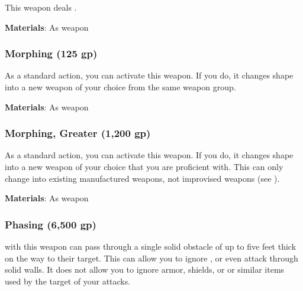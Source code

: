 This weapon deals .



\vspace{0.25em}
\textbf{Materials}: As weapon


\lowercase{\hypertarget{item:Morphing}{}}\label{item:Morphing}
\hypertarget{item:Morphing}{\subsubsection{Morphing\hfill{} (125 gp)}}

As a standard action, you can activate this weapon.
If you do, it changes shape into a new weapon of your choice from the same weapon group.



\vspace{0.25em}
\textbf{Materials}: As weapon


\lowercase{\hypertarget{item:Morphing, Greater}{}}\label{item:Morphing, Greater}
\hypertarget{item:Morphing, Greater}{\subsubsection{Morphing, Greater\hfill{} (1,200 gp)}}

As a standard action, you can activate this weapon.
If you do, it changes shape into a new weapon of your choice that you are proficient with.
This can only change into existing manufactured weapons, not improvised weapons (see ).



\vspace{0.25em}
\textbf{Materials}: As weapon


\lowercase{\hypertarget{item:Phasing}{}}\label{item:Phasing}
\hypertarget{item:Phasing}{\subsubsection{Phasing\hfill{} (6,500 gp)}}

 with this weapon can pass through a single solid obstacle of up to five feet thick on the way to their target.
This can allow you to ignore , or even attack through solid walls.
It does not allow you to ignore armor, shields, or or similar items used by the target of your attacks.



